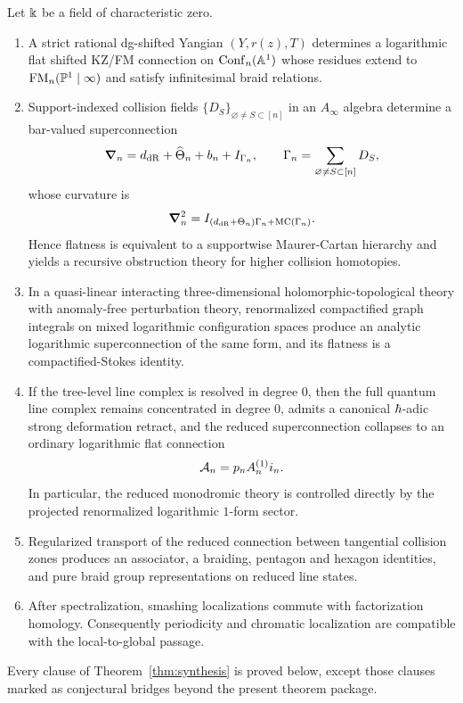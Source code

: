 \begin{theorem}\label{thm:synthesis}
Let $\Bbbk$ be a field of characteristic zero.
\begin{enumerate}[label=\textup{(\roman*)}]
 \item A strict rational dg-shifted Yangian $(Y,r(z),T)$ determines a logarithmic flat shifted KZ/FM connection on $\mathrm{Conf}_n(\mathbb A^1)$ whose residues extend to $\mathrm{FM}_n(\mathbb P^1\mid\infty)$ and satisfy infinitesimal braid relations.
 \item Support-indexed collision fields $\{D_S\}_{\varnothing\neq S\subset[n]}$ in an $A_\infty$ algebra determine a bar-valued superconnection
 \[
 \boldsymbol{\nabla}_n=d_{\mathrm{dR}}+\widehat\Theta_n+b_n+I_{\Gamma_n},\qquad \Gamma_n=\sum_{\varnothing\neq S\subset[n]}D_S,
 \]
 whose curvature is
 \[
 \boldsymbol{\nabla}_n^2 = I_{(d_{\mathrm{dR}}+\Theta_n)\Gamma_n+\mathrm{MC}(\Gamma_n)}.
 \]
 Hence flatness is equivalent to a supportwise Maurer-Cartan hierarchy and yields a recursive obstruction theory for higher collision homotopies.
 \item In a quasi-linear interacting three-dimensional holomorphic-topological theory with anomaly-free perturbation theory, renormalized compactified graph integrals on mixed logarithmic configuration spaces produce an analytic logarithmic superconnection of the same form, and its flatness is a compactified-Stokes identity.
 \item If the tree-level line complex is resolved in degree $0$, then the full quantum line complex remains concentrated in degree $0$, admits a canonical $\hbar$-adic strong deformation retract, and the reduced superconnection collapses to an ordinary logarithmic flat connection
 \[
 \mathcal A_n = p_n A_n^{(1)} i_n.
 \]
 In particular, the reduced monodromic theory is controlled directly by the projected renormalized logarithmic $1$-form sector.
 \item Regularized transport of the reduced connection between tangential collision zones produces an associator, a braiding, pentagon and hexagon identities, and pure braid group representations on reduced line states.
 \item After spectralization, smashing localizations commute with factorization homology. Consequently periodicity and chromatic localization are compatible with the local-to-global passage.
\end{enumerate}
\end{theorem}

Every clause of Theorem~\ref{thm:synthesis} is proved below, except those clauses marked as conjectural bridges beyond the present theorem package.


